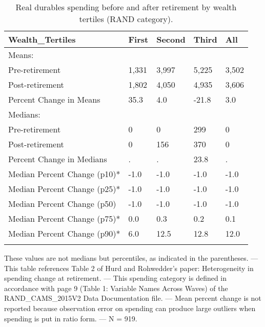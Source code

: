 \begin{table}[tbp] \centering
{}

\caption{Real durables spending before and after retirement by wealth tertiles (RAND category).}
\begin{tabularx}{\textwidth}{lCCCC}

\toprule
{Wealth\_Tertiles}&{First}&{Second}&{Third}&{All} \tabularnewline
\midrule\addlinespace[1.5ex]
Means:&&&& \tabularnewline
\midrule Pre-retirement&1,331&3,997&5,225&3,502 \tabularnewline
Post-retirement&1,802&4,050&4,935&3,606 \tabularnewline
Percent Change in Means&35.3&4.0&-21.8&3.0 \tabularnewline
\midrule Medians:&&&& \tabularnewline
\midrule Pre-retirement&0&0&299&0 \tabularnewline
Post-retirement&0&156&370&0 \tabularnewline
Percent Change in Medians&.&.&23.8&. \tabularnewline
Median Percent Change (p10)*&-1.0&-1.0&-1.0&-1.0 \tabularnewline
Median Percent Change (p25)*&-1.0&-1.0&-1.0&-1.0 \tabularnewline
Median Percent Change (p50)&-1.0&-1.0&-1.0&-1.0 \tabularnewline
Median Percent Change (p75)*&0.0&0.3&0.2&0.1 \tabularnewline
Median Percent Change (p90)*&6.0&12.5&12.8&12.0 \tabularnewline
\bottomrule \addlinespace[1.5ex]

\end{tabularx}
\begin{flushleft}
\footnotesize *These values are not medians but percentiles, as indicated in the parentheses. \linebreak --- \linebreak This table references Table 2 of Hurd and Rohwedder's paper: Heterogeneity in spending change at retirement. \linebreak --- \linebreak This spending category is defined in accordance with page 9 (Table 1: Variable Names Across Waves) of the RAND\_CAMS\_2015V2 Data Documentation file. \linebreak --- \linebreak Mean percent change is not reported because observation error on spending can produce large outliers when spending is put in ratio form. \linebreak --- \linebreak N = 919.
\end{flushleft}
\end{table}
